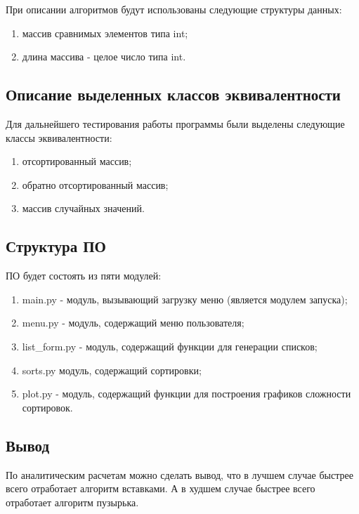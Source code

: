 \documentclass[14pt,russian]{scrartcl}
\begin{document}
При описании алгоритмов будут использованы следующие структуры данных:

\begin{enumerate}
    \item массив сравнимых элементов типа int;
    \item длина массива - целое число типа int.
\end{enumerate}

\subsection{Описание выделенных классов эквивалентности}

Для дальнейшего тестирования работы программы были выделены следующие классы эквивалентности:

\begin{enumerate}
    \item отсортированный массив;
    \item обратно отсортированный массив;
    \item массив случайных значений.
\end{enumerate}

\subsection{Структура ПО}

ПО будет состоять из пяти модулей:

\begin{enumerate}
    \item main.py - модуль, вызывающий загрузку меню (является модулем запуска);
    \item menu.py - модуль, содержащий меню пользователя;
    \item list\_form.py - модуль, содержащий функции для генерации списков;
    \item sorts.py модуль, содержащий сортировки;
    \item plot.py - модуль, содержащий функции для построения графиков сложности сортировок.
\end{enumerate}

\subsection{Вывод}

По аналитическим расчетам можно сделать вывод, что в лучшем случае быстрее всего отработает алгоритм вставками.
А в худшем случае быстрее всего отработает алгоритм пузырька.
\end{document}
